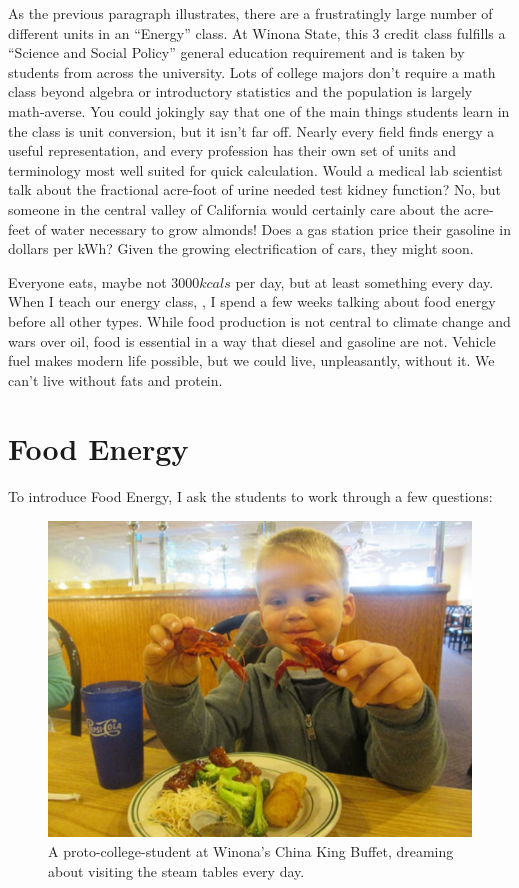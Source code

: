 \documentclass[12pt]{iopart}
\begin{document}
As the previous paragraph illustrates, there are a frustratingly large number of different units in an ``Energy'' class.  At Winona State, this 3 credit class fulfills a ``Science and Social Policy'' general education requirement and is taken by students from across the university.   Lots of college majors don't require a math class beyond algebra or introductory statistics and the population is largely math-averse. You could jokingly say that one of the main things students learn in the class is unit conversion, but it isn't far off.  Nearly every field finds energy a useful representation, and every profession has their own set of units and terminology most well suited for quick calculation.  Would a medical lab scientist talk about the fractional acre-foot of urine needed test kidney function?  No, but someone in the central valley of California would certainly care about the acre-feet of water necessary to grow almonds!  Does a gas station price their gasoline in dollars per kWh? Given the growing electrification of cars, they might soon.

Everyone eats, maybe not $3000 kcals$ per day, but at least something every day.  When I teach our energy class,
\cite{Energy_textbook,PFFP}, 
I spend a few weeks talking about food energy before all other types.  While food production is not central to climate change and wars over oil, food is essential in a way that diesel and gasoline are not.  Vehicle fuel makes modern life possible, but we could live, unpleasantly, without it.  We can't live without fats and protein.  

\section{Food Energy}

To introduce Food Energy, I ask the students to work through a few questions:

\begin{figure}[h]
\centering
\includegraphics[width=\columnwidth]{at_the_buffet.jpg}
\caption{
A proto-college-student at Winona's China King Buffet, dreaming about visiting the steam tables every day. 
}
\label{buffet}
\end{figure}
\end{document}
